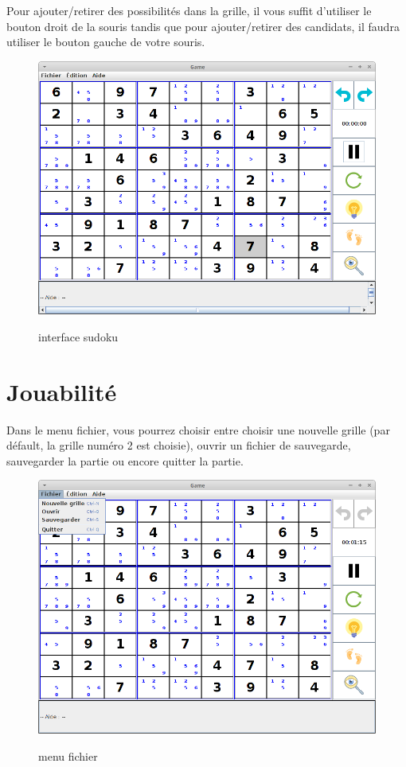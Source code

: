 Pour ajouter/retirer des possibilités dans la grille, il vous suffit d'utiliser 
le bouton droit de la souris tandis que pour ajouter/retirer des candidats, il 
faudra utiliser le bouton gauche de votre souris.

\begin{figure}[ht]
  \caption{\label{annexe6} interface sudoku}
  \includegraphics [width=130mm]{images/interface.png} \\[0.5cm]
\end{figure}

\newpage
\section{Jouabilité}
Dans le menu fichier, vous pourrez choisir entre choisir 
une nouvelle grille (par défault, la grille numéro 2 est choisie),
ouvrir un fichier de sauvegarde, 
sauvegarder la partie ou encore quitter la partie.

\begin{figure}[ht]
  \caption{\label{annexe7} menu fichier}
  \includegraphics [width=130mm]{images/fichier.png} \\[0.5cm]
\end{figure}

